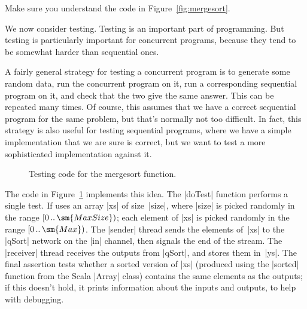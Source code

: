 \begin{instruction}
Make sure you understand the code in Figure~\ref{fig:mergesort}.
\end{instruction}


We now consider testing.  Testing is an important part of programming.  But
testing is particularly important for concurrent programs, because they tend
to be somewhat harder than sequential ones.

A fairly general strategy for testing a concurrent program is to generate some
random data, run the concurrent program on it, run a corresponding sequential
program on it, and check that the two give the same answer.  This can be
repeated many times.  Of course, this assumes that we have a correct
sequential program for the same problem, but that's normally not too
difficult.  In fact, this strategy is also useful for testing sequential
programs, where we have a simple implementation that we are sure is correct,
but we want to test a more sophisticated implementation against it.

\begin{figure}
\caption{Testing code for the {\scalashape mergesort} function.}
\label{fig:mergesort-test}
\end{figure}

The code in Figure~\ref{fig:mergesort-test} implements this idea.  The |doTest|
function performs a single test.  If uses an array |xs| of size~|size|, where
|size| is picked randomly in the range $\interval{0}{\sm{MaxSize}}$; each
element of |xs| is picked randomly in the range $\interval{0}{\sm{Max}}$.  The
|sender| thread sends the elements of~|xs| to the |qSort| network on the |in|
channel, then signals the end of the stream.  The |receiver| thread receives
the outputs from |qSort|, and stores them in~|ys|.  The final assertion tests
whether a sorted version of |xs| (produced using the |sorted| function from
the Scala |Array| class) contains the same elements as the outputs; if this
doesn't hold, it prints information about the inputs and outputs, to help with
debugging.

